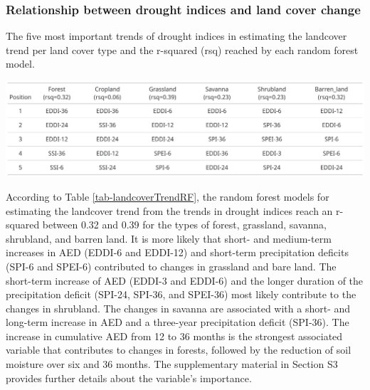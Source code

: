 \documentclass[
  authoryear,
  preprint,
  3p,
  onecolumn]{elsarticle}
\begin{document}
\hypertarget{relationship-between-drought-indices-and-land-cover-change}{%
\subsubsection{Relationship between drought indices and land cover
change}\label{relationship-between-drought-indices-and-land-cover-change}}

\begin{table}[!ht]
\caption{The five most important trends of drought indices in estimating the landcover trend per land cover type and the r-squared (rsq) reached by each random forest model.}
\label{tab-landcoverTrendRF}
\includegraphics[]{../output/figs/table_importance_trends_landcover_vs_drought.png}
\end{table}

According to Table \ref{tab-landcoverTrendRF}, the random forest models
for estimating the landcover trend from the trends in drought indices
reach an r-squared between 0.32 and 0.39 for the types of forest,
grassland, savanna, shrubland, and barren land. It is more likely that
short- and medium-term increases in AED (EDDI-6 and EDDI-12) and
short-term precipitation deficits (SPI-6 and SPEI-6) contributed to
changes in grassland and bare land. The short-term increase of AED
(EDDI-3 and EDDI-6) and the longer duration of the precipitation deficit
(SPI-24, SPI-36, and SPEI-36) most likely contribute to the changes in
shrubland. The changes in savanna are associated with a short- and
long-term increase in AED and a three-year precipitation deficit
(SPI-36). The increase in cumulative AED from 12 to 36 months is the
strongest associated variable that contributes to changes in forests,
followed by the reduction of soil moisture over six and 36 months. The
supplementary material in Section S3 provides further details about the
variable's importance.
\end{document}
